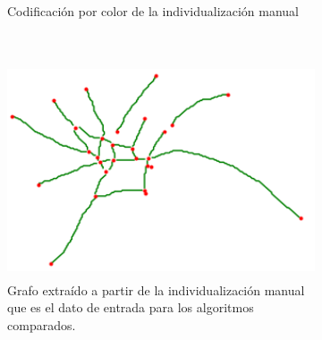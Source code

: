 \begin{figure}[h!]
\begin{subfigure}[t]{0.49\textwidth}
        \caption{Codificaci\'on por color de la individualizaci\'on manual}
        \label{fig:SpinningMarchantia-indivManual}
    \end{subfigure}
    ~
    \begin{subfigure}[t]{0.49\textwidth}
        \centering
        \includegraphics[height=2.5in]{benchImages/50-ROIs-Spinning-Marchantia-graph-og.png}
        \caption{Grafo extra\'ido a partir de la individualizaci\'on manual que es el dato de entrada para los algoritmos comparados.}
        \label{fig:SpinningMarchantia-graph}
    \end{subfigure}
    \caption{}
    \label{fig:SpinningMarchantia}
\end{figure}




